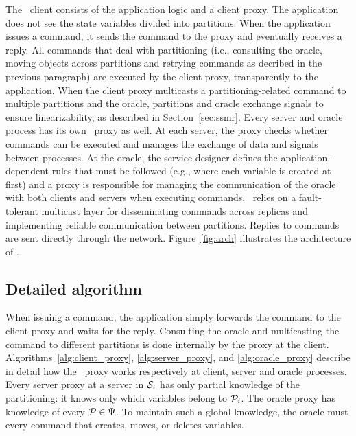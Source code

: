 

The \dssmr\ client consists of the application logic and a client proxy.
The application does not see the state variables divided into partitions.
When the application issues a command, it sends the command to the proxy and eventually receives a reply.
All commands that deal with partitioning (i.e., consulting the oracle, moving objects across partitions and retrying commands as decribed in the previous paragraph) are executed by the client proxy, transparently to the application.
When the client proxy multicasts a partitioning-related command to multiple partitions and the oracle, partitions and oracle exchange signals to ensure linearizability, as described in Section~\ref{sec:ssmr}.
Every server and oracle process has its own \dssmr\ proxy as well.
At each server, the proxy checks whether commands can be executed and manages the exchange of data and signals between processes.
At the oracle, the service designer defines the application-dependent rules that must be followed (e.g., where each variable is created at first) and a proxy is responsible for managing the communication of the oracle with both clients and servers when executing commands.
\dssmr\ relies on a fault-tolerant multicast layer for disseminating commands across replicas and implementing reliable communication between partitions.
Replies to commands are sent directly through the network.
Figure~\ref{fig:arch} illustrates the architecture of \dssmr{}.

\subsection{Detailed algorithm}
\label{sec:algorithm}


When issuing a command, the application simply forwards the command to the client proxy and waits for the reply.
Consulting the oracle and multicasting the command to different partitions is done internally by the proxy at the client.
Algorithms~\ref{alg:client_proxy}, \ref{alg:server_proxy}, and \ref{alg:oracle_proxy} describe in detail how the \dssmr\ proxy works respectively at client, server and oracle processes.
Every server proxy at a server in $\mathcal{S}_i$ has only partial knowledge of the partitioning: it knows only which variables belong to $\mathcal{P}_i$.
The oracle proxy has knowledge of every $\mathcal{P} \in \Psi$.
To maintain such a global knowledge, the oracle must \amdel{} every command that creates, moves, or deletes variables.

